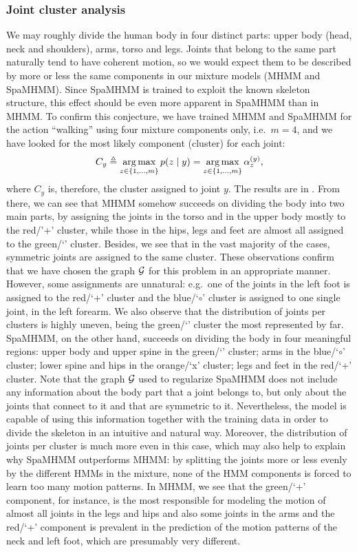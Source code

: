 \subsubsection{Joint cluster analysis}
\label{sec:spamhmm_cluster}
We may roughly divide the human body in four distinct parts: upper body (head, neck and shoulders), arms, torso and legs. Joints that belong to the same part naturally tend to have coherent motion, so we would expect them to be described by more or less the same components in our mixture models (MHMM and SpaMHMM). Since SpaMHMM is trained to exploit the known skeleton structure, this effect should be even more apparent in SpaMHMM than in MHMM. To confirm this conjecture, we have trained MHMM and SpaMHMM for the action ``walking'' using four mixture components only, i.e.\ $m=4$, and we have looked for the most likely component (cluster) for each joint:
\begin{equation}
    C_y \triangleq \operatorname*{arg\,max}_{z \in \{1,\dots,m\}} p(z \mid y) = \operatorname*{arg\,max}_{z \in \{1,\dots,m\}} {\alpha}^{(y)}_z,
\end{equation}
where $C_y$ is, therefore, the cluster assigned to joint $y$. The results are in . From there, we can see that MHMM somehow succeeds on dividing the body into two main parts, by assigning the joints in the torso and in the upper body mostly to the red/'+' cluster, while those in the hips, legs and feet are almost all assigned to the green/`\SmallTriangleUp' cluster. Besides, we see that in the vast majority of the cases, symmetric joints are assigned to the same cluster. These observations confirm that we have chosen the graph ${\mathcal{G}}$ for this problem in an appropriate manner. However, some assignments are unnatural: e.g.\  one of the joints in the left foot is assigned to the red/`+' cluster and the blue/`$\circ$' cluster is assigned to one single joint, in the left forearm. We also observe that the distribution of joints per clusters is highly uneven, being the green/`\SmallTriangleUp' cluster the most represented by far. SpaMHMM, on the other hand, succeeds on dividing the body in four meaningful regions: upper body and upper spine in the green/`\SmallTriangleUp' cluster; arms in the blue/`$\circ$' cluster; lower spine and hips in the orange/`x' cluster; legs and feet in the red/`+' cluster. Note that the graph ${\mathcal{G}}$ used to regularize SpaMHMM does not include any information about the body part that a joint belongs to, but only about the joints that connect to it and that are symmetric to it. Nevertheless, the model is capable of using this information together with the training data in order to divide the skeleton in an intuitive and natural way. Moreover, the distribution of joints per cluster is much more even in this case, which may also help to explain why SpaMHMM outperforms MHMM: by splitting the joints more or less evenly by the different HMMs in the mixture, none of the HMM components is forced to learn too many motion patterns. In MHMM, we see that the green/`+' component, for instance, is the most responsible for modeling the motion of almost all joints in the legs and hips and also some joints in the arms and the red/`+' component is prevalent in the prediction of the motion patterns of the neck and left foot, which are presumably very different.

